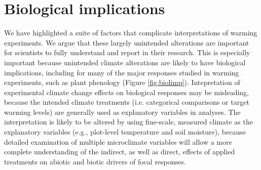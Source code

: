 \documentclass{article}
\begin{document}
\section* {Biological implications}


\par We have highlighted a suite of factors that complicate interpretations of warming experiments. We argue that these largely unintended alterations are important for scientists to fully understand and report in their research. This is especially important because unintended climate alterations are likely to have biological implications, including for many of the major responses studied in warming experiments, such as plant phenology (Figure \ref{fig:biolimp}). Intepretation of experimental climate change effects on biological responses may be misleading, because the intended climate treatments (i.e. categorical comparisons or target warming levels) are generally used as explanatory variables in analyses. The interpretation is likely to be altered by using fine-scale, measured climate as the explanatory variables (e.g., plot-level temperature and soil moisture), because detailed examination of multiple microclimate variables will allow a more complete understanding of the indirect, as well as direct, effects of applied treatments on abiotic and biotic drivers of focal responses.
\end{document}

